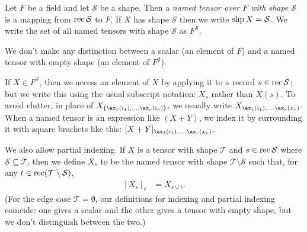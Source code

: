\begin{definition}
Let $F$ be a field and let $\mathcal{S}$ be a shape. Then a \emph{named tensor over $F$ with shape $\mathcal{S}$} is a mapping from $\operatorname{rec} \mathcal{S}$ to $F$. If $X$ has shape $\mathcal{S}$ then we write $\operatorname{shp} X = \mathcal{S}$. We write the set of all named tensors with shape $\mathcal{S}$ as $F^{\mathcal{S}}$.
\end{definition}

We don't make any distinction between a scalar (an element of $F$) and a named tensor with empty shape (an element of $F^\emptyset$).

If $X \in F^{\mathcal{S}}$, then we access an element of $X$ by applying it to a record $s \in \operatorname{rec} \mathcal{S}$; but we write this using the usual subscript notation: $X_s$ rather than $X(s)$. To avoid clutter, in place of $X_{\{\ax_1(i_1), \ldots, \ax_r(i_r)\}}$, we usually write $X_{\ax_1(i_1), \ldots, \ax_r(x_r)}$. When a named tensor is an expression like $(X+Y)$, we index it by surrounding it with square brackets like this: $[X+Y]_{\ax_1(i_1), \ldots, \ax_r(x_r)}$.

We also allow partial indexing. If $X$ is a tensor with shape $\mathcal{T}$ and $s \in \operatorname{rec} \mathcal{S}$ where $\mathcal{S} \subseteq \mathcal{T}$, then we define $X_s$ to be the named tensor with shape $\mathcal{T} \setminus \mathcal{S}$ such that, for any $t \in \operatorname{rec} (\mathcal{T} \setminus \mathcal{S})$,
\begin{align*}
\left[X_s\right]_t &= X_{s \cup t}.
\end{align*}
(For the edge case $\mathcal{T} = \emptyset$, our definitions for indexing and partial indexing coincide: one gives a scalar and the other gives a tensor with empty shape, but we don't distinguish between the two.)

